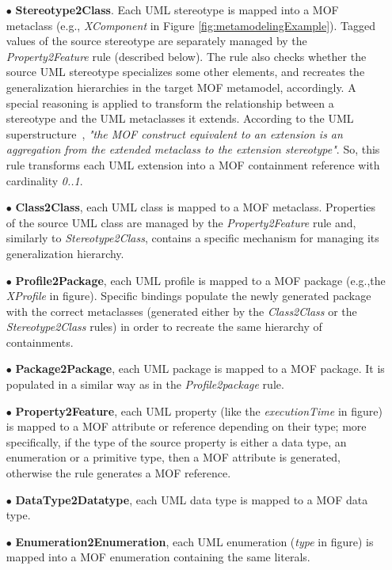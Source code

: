\begin{itemize}
	\item[$\bullet$] \textbf{Stereotype2Class}. Each UML stereotype is mapped into a MOF metaclass
	(e.g., \textit{XComponent} in Figure \ref{fig:metamodelingExample}).  		
	Tagged values of the source stereotype are separately managed by the \textit{Property2Feature} rule (described below).
	The rule also checks whether the source UML stereotype specializes some other elements, and recreates the generalization hierarchies in the target MOF metamodel, accordingly.
	A special reasoning is applied to transform the relationship between a stereotype and the UML metaclasses it extends.
	According to the UML superstructure~\cite{UML}, \textit{"the MOF construct equivalent to an extension is an aggregation from
	the extended metaclass to the extension stereotype"}. So, this rule transforms each UML extension into
	a MOF containment reference with cardinality \textit{0..1}. 	
	\item[$\bullet$] \textbf{Class2Class}, each UML class is mapped to a MOF metaclass.
	Properties of the source UML class are managed by the \textit{Property2Feature} rule and, similarly to \textit{Stereotype2Class},
	contains a specific mechanism for managing its generalization hierarchy.
	\item[$\bullet$] \textbf{Profile2Package}, each UML profile is mapped to a MOF package (e.g.,the \textit{ XProfile} in figure). Specific bindings populate the newly generated package with the correct metaclasses (generated either by the \textit{Class2Class} or the \textit{Stereotype2Class} rules) in order to recreate the same hierarchy of containments.
	\item[$\bullet$] \textbf{Package2Package}, each UML package is mapped to a MOF package. It is populated in a similar way as in the \textit{Profile2package} rule.
	\item[$\bullet$] \textbf{Property2Feature}, each UML property (like the \textit{executionTime} in figure)
	is mapped to a MOF attribute or reference depending on their type;
	more specifically, if the type of the source property is either a data type, an enumeration or a primitive type,
	then a MOF attribute is generated, otherwise the rule generates a MOF reference.
	\item[$\bullet$] \textbf{DataType2Datatype}, each UML data type is mapped to a MOF data type.
	\item[$\bullet$] \textbf{Enumeration2Enumeration}, each UML enumeration (\textit{type} in figure)
	is mapped into a MOF enumeration containing the same literals.
\end{itemize}


